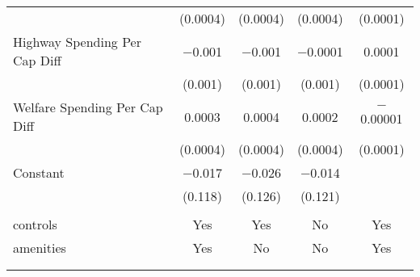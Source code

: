 \begin{table}[!htbp]
\begin{tabular}{@{\extracolsep{5pt}}lcccc}
  & (0.0004) & (0.0004) & (0.0004) & (0.0001) \\ 
  Highway Spending Per Cap Diff & $-$0.001 & $-$0.001 & $-$0.0001 & 0.0001 \\ 
  & (0.001) & (0.001) & (0.001) & (0.0001) \\ 
  Welfare Spending Per Cap Diff & 0.0003 & 0.0004 & 0.0002 & $-$0.00001 \\ 
  & (0.0004) & (0.0004) & (0.0004) & (0.0001) \\ 
  Constant & $-$0.017 & $-$0.026 & $-$0.014 &  \\ 
  & (0.118) & (0.126) & (0.121) &  \\ 
 \hline \\[-1.8ex] 
controls & Yes & Yes & No & Yes \\ 
amenities & Yes & No & No & Yes \\ 
\hline \\[-1.8ex] 
\hline 
\hline \\[-1.8ex] 
\end{tabular} 
\end{table} 
